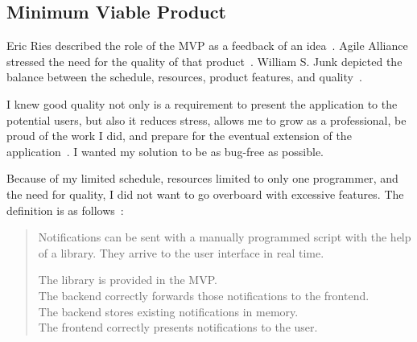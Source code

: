 \subsection{Minimum Viable Product}\label{sec:minimum-viable-product}

Eric Ries described the role of the MVP
as a feedback of an idea~\cite{ries_lean_2011}.
Agile Alliance stressed the need
for the quality of that product~\cite{foster_mvp_2022}.
William S. Junk depicted the balance between
the schedule,
resources,
product features,
and quality~\cite{junk_dynamic_2000}.

I knew good quality not only is a requirement
to present the application to the potential users,
but also it reduces stress,
allows me to grow as a professional,
be proud of the work I did,
and prepare for the eventual extension
of the application~\cite{beck_extreme_2004,foster_mvp_2022,martin_clean_2011}.
I wanted my solution to be
as bug-free as possible.

Because of my limited schedule,
resources limited to only one programmer,
and the need for quality,
I did not want to go overboard
with excessive features.
The definition is as follows~\cite{sewera_mvp_2022}:

\begin{quote}
  Notifications can be sent with a manually programmed script
  with the help of a library.
  They arrive to the user interface in real time.

  The library is provided in the MVP.\\
  The backend correctly forwards those notifications to the frontend.\\
  The backend stores existing notifications in memory.\\
  The frontend correctly presents notifications to the user.
\end{quote}
